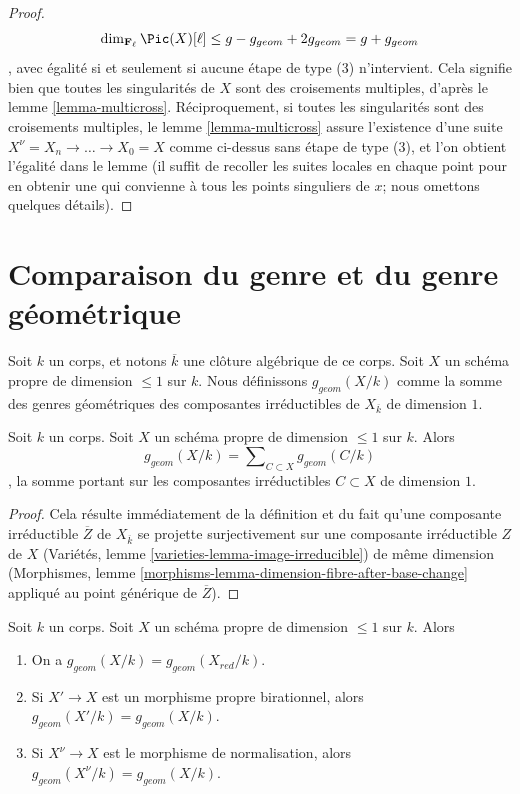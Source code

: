 \begin{proof}
$$\dim_{\mathbf{F}_\ell} \Pic(X)[\ell] \leq
g - g_{geom} + 2g_{geom} = g + g_{geom}
$$, avec égalité si et seulement si aucune étape de type (3) n'intervient. Cela signifie bien que toutes les singularités de $X$ sont des croisements multiples, d'après le lemme \ref{lemma-multicross}. Réciproquement, si toutes les singularités sont des croisements multiples, le lemme \ref{lemma-multicross} assure l'existence d'une suite $X^\nu = X_n \to \ldots \to X_0 = X$ comme ci-dessus sans étape de type (3), et l'on obtient l'égalité dans le lemme (il suffit de recoller les suites locales en chaque point pour en obtenir une qui convienne à tous les points singuliers de $x$; nous omettons quelques détails).
\end{proof}





\section{Comparaison du genre et du genre géométrique}
\label{section-genus-geometric-genus}

\noindent
Soit $k$ un corps, et notons $\overline{k}$ une clôture algébrique de ce corps. Soit $X$ un schéma propre de dimension $\leq 1$ sur $k$. Nous définissons $g_{geom}(X/k)$ comme la somme des genres géométriques des composantes irréductibles de $X_{\overline{k}}$ de dimension $1$.

\begin{lemma}
\label{lemma-bound-geometric-genus}
Soit $k$ un corps. Soit $X$ un schéma propre de dimension $\leq 1$ sur $k$. Alors $$
g_{geom}(X/k) = \sum\nolimits_{C \subset X} g_{geom}(C/k)
$$, la somme portant sur les composantes irréductibles $C \subset X$ de dimension $1$.
\end{lemma}

\begin{proof}
Cela résulte immédiatement de la définition et du fait qu'une composante irréductible $\overline{Z}$ de $X_{\overline{k}}$ se projette surjectivement sur une composante irréductible $Z$ de $X$ (Variétés, lemme \ref{varieties-lemma-image-irreducible}) de même dimension (Morphismes, lemme \ref{morphisms-lemma-dimension-fibre-after-base-change} appliqué au point générique de $\overline{Z}$).
\end{proof}

\begin{lemma}
\label{lemma-geometric-genus-normalization}
Soit $k$ un corps. Soit $X$ un schéma propre de dimension $\leq 1$ sur $k$. Alors \begin{enumerate} \item On a $g_{geom}(X/k) = g_{geom}(X_{red}/k)$. \item Si $X' \to X$ est un morphisme propre birationnel, alors $g_{geom}(X'/k) = g_{geom}(X/k)$. \item Si $X^\nu \to X$ est le morphisme de normalisation, alors $g_{geom}(X^\nu/k) = g_{geom}(X/k)$.
\end{enumerate}
\end{lemma}

